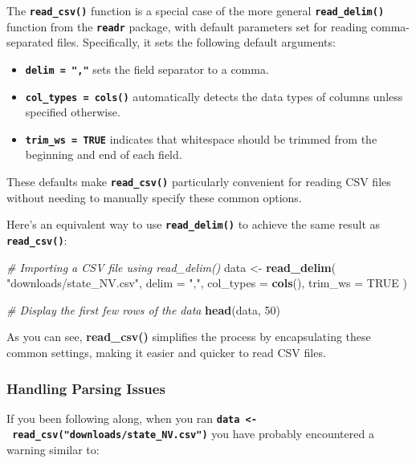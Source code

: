 \documentclass[
]{book}
\newenvironment{Shaded}{\begin{snugshade}}{\end{snugshade}}
\newcommand{\AttributeTok}[1]{\textcolor[rgb]{0.13,0.29,0.53}{#1}}
\newcommand{\CommentTok}[1]{\textcolor[rgb]{0.56,0.35,0.01}{\textit{#1}}}
\newcommand{\ConstantTok}[1]{\textcolor[rgb]{0.56,0.35,0.01}{#1}}
\newcommand{\DecValTok}[1]{\textcolor[rgb]{0.00,0.00,0.81}{#1}}
\newcommand{\FunctionTok}[1]{\textcolor[rgb]{0.13,0.29,0.53}{\textbf{#1}}}
\newcommand{\NormalTok}[1]{#1}
\newcommand{\OtherTok}[1]{\textcolor[rgb]{0.56,0.35,0.01}{#1}}
\newcommand{\StringTok}[1]{\textcolor[rgb]{0.31,0.60,0.02}{#1}}
\providecommand{\tightlist}{%
  \setlength{\itemsep}{0pt}\setlength{\parskip}{0pt}}
\begin{document}
The \textbf{\texttt{read\_csv()}} function is a special case of the more general \textbf{\texttt{read\_delim()}} function from the \textbf{\texttt{readr}} package, with default parameters set for reading comma-separated files. Specifically, it sets the following default arguments:

\begin{itemize}
\tightlist
\item
  \textbf{\texttt{delim\ =\ ","}} sets the field separator to a comma.
\item
  \textbf{\texttt{col\_types\ =\ cols()}} automatically detects the data types of columns unless specified otherwise.
\item
  \textbf{\texttt{trim\_ws\ =\ TRUE}} indicates that whitespace should be trimmed from the beginning and end of each field.
\end{itemize}

These defaults make \textbf{\texttt{read\_csv()}} particularly convenient for reading CSV files without needing to manually specify these common options.

Here's an equivalent way to use \textbf{\texttt{read\_delim()}} to achieve the same result as \textbf{\texttt{read\_csv()}}:

\begin{Shaded}
\begin{Highlighting}[]
\CommentTok{\# Importing a CSV file using read\_delim()}
\NormalTok{data }\OtherTok{\textless{}{-}} \FunctionTok{read\_delim}\NormalTok{(}
  \StringTok{"downloads/state\_NV.csv"}\NormalTok{,}
  \AttributeTok{delim =} \StringTok{","}\NormalTok{,}
  \AttributeTok{col\_types =} \FunctionTok{cols}\NormalTok{(),}
  \AttributeTok{trim\_ws =} \ConstantTok{TRUE}
\NormalTok{)}

\CommentTok{\# Display the first few rows of the data}
\FunctionTok{head}\NormalTok{(data, }\DecValTok{50}\NormalTok{)}
\end{Highlighting}
\end{Shaded}

As you can see, \textbf{read\_csv()} simplifies the process by encapsulating these common settings, making it easier and quicker to read CSV files.

\subsubsection{Handling Parsing Issues}\label{handling-parsing-issues}

If you been following along, when you ran \textbf{\texttt{data\ \textless{}-\ read\_csv("downloads/state\_NV.csv")}} you have probably encountered a {warning} similar to:
\end{document}
